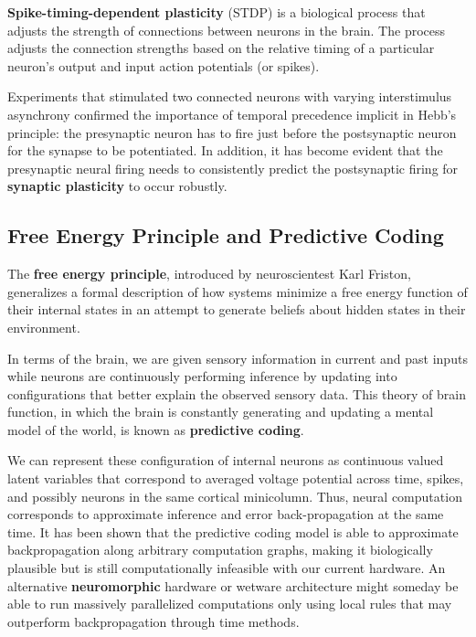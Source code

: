 \documentclass{article}
\begin{document}
\textbf{Spike-timing-dependent plasticity} (STDP) is a biological process that adjusts the strength of connections between neurons in the brain. The process adjusts the connection strengths based on the relative timing of a particular neuron's output and input action potentials (or spikes). 

Experiments that stimulated two connected neurons with varying interstimulus asynchrony confirmed the importance of temporal precedence implicit in Hebb's principle: the presynaptic neuron has to fire just before the postsynaptic neuron for the synapse to be potentiated. In addition, it has become evident that the presynaptic neural firing needs to consistently predict the postsynaptic firing for \textbf{synaptic plasticity} to occur robustly.


\subsection{Free Energy Principle and Predictive Coding}
The \textbf{free energy principle}, introduced by neuroscientest Karl Friston, generalizes a formal description of how systems minimize a free energy function of their internal states in an attempt to generate beliefs about hidden states in their environment.

In terms of the brain, we are given sensory information in current and past inputs while neurons are continuously performing inference by updating into configurations that better explain the observed sensory data. This theory of brain function, in which the brain is constantly generating and updating a mental model of the world, is known as \textbf{predictive coding}.

We can represent these configuration of internal neurons as continuous valued latent variables that correspond to averaged voltage potential across time, spikes, and possibly neurons in the same cortical minicolumn. Thus, neural computation corresponds to approximate inference and error back-propagation at the same time. It has been shown that the predictive coding model is able to approximate backpropagation along arbitrary computation graphs, making it biologically plausible but is still computationally infeasible with our current hardware. An alternative \textbf{neuromorphic} hardware or wetware architecture might someday be able to run massively parallelized computations only using local rules that may outperform backpropagation through time methods.
\end{document}
